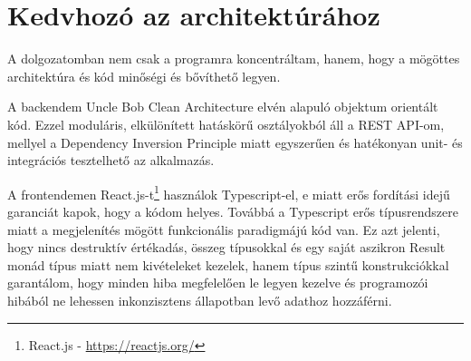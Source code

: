 \section{Kedvhozó az architektúrához}
A dolgozatomban nem csak a programra koncentráltam, hanem, hogy a mögöttes architektúra és kód minőségi és bővíthető legyen.

A backendem Uncle Bob Clean Architecture \cite{cleanArchitecturePost} elvén alapuló objektum orientált kód. Ezzel moduláris, elkülönített hatáskörű osztályokból áll a REST API-om, mellyel a Dependency Inversion Principle miatt egyszerűen és hatékonyan unit- és integrációs tesztelhető az alkalmazás.

A frontendemen React.js-t\footnote{React.js - \href{https://reactjs.org/}{https://reactjs.org/}} használok Typescript-el, e miatt erős fordítási idejű garanciát kapok, hogy a kódom helyes. Továbbá a Typescript erős típusrendszere miatt a megjelenítés mögött funkcionális paradigmájú kód van. Ez azt jelenti, hogy nincs destruktív értékadás, összeg típusokkal és egy saját aszikron Result monád típus miatt nem kivételeket kezelek, hanem típus szintű konstrukciókkal garantálom, hogy minden hiba megfelelően le legyen kezelve és programozói hibából ne lehessen inkonzisztens állapotban levő adathoz hozzáférni.
